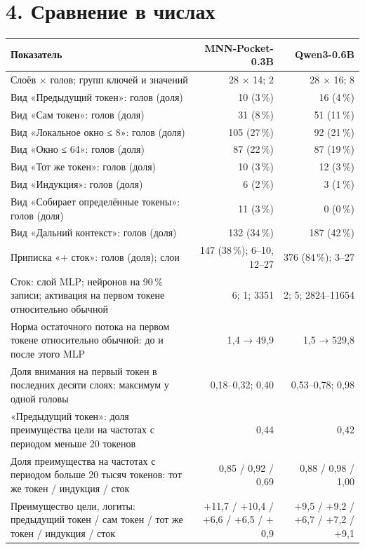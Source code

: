 \documentclass[10pt]{article}
\begin{document}
\noindent\begin{minipage}{\linewidth}
\section*{4. Сравнение в числах}
\begin{center}{\small\begin{tabular}{|p{11.2cm}|r|r|}\hline
\rowcolor{head}\textbf{Показатель} & \textbf{MNN-Pocket-0.3B} & \textbf{Qwen3-0.6B} \\ \hline
Слоёв $\times$ голов; групп ключей и значений & 28 $\times$ 14; 2 & 28 $\times$ 16; 8 \\ \hline
Вид «Предыдущий токен»: голов (доля) & 10 (3\,\%) & 16 (4\,\%) \\ \hline
Вид «Сам токен»: голов (доля) & 31 (8\,\%) & 51 (11\,\%) \\ \hline
Вид «Локальное окно ≤ 8»: голов (доля) & 105 (27\,\%) & 92 (21\,\%) \\ \hline
Вид «Окно ≤ 64»: голов (доля) & 87 (22\,\%) & 87 (19\,\%) \\ \hline
Вид «Тот же токен»: голов (доля) & 10 (3\,\%) & 12 (3\,\%) \\ \hline
Вид «Индукция»: голов (доля) & 6 (2\,\%) & 3 (1\,\%) \\ \hline
Вид «Собирает определённые токены»: голов (доля) & 11 (3\,\%) & 0 (0\,\%) \\ \hline
Вид «Дальний контекст»: голов (доля) & 132 (34\,\%) & 187 (42\,\%) \\ \hline
Приписка «+ сток»: голов (доля); слои & 147 (38\,\%); \mbox{6–10}, \mbox{12–27} & 376 (84\,\%); \mbox{3–27} \\ \hline
Сток: слой MLP; нейронов на 90\,\% записи; активация на первом токене относительно обычной & 6; 1; 3351 & 2; 5; 2824–11654 \\ \hline
Норма остаточного потока на первом токене относительно обычной: до и после этого MLP & 1,4 → 49,9 & 1,5 → 529,8 \\ \hline
Доля внимания на первый токен в последних десяти слоях; максимум у одной головы & 0,18–0,32; 0,40 & 0,53–0,78; 0,98 \\ \hline
«Предыдущий токен»: доля преимущества цели на частотах с периодом меньше 20 токенов & 0,44 & 0,42 \\ \hline
Доля преимущества на частотах с периодом больше 20 тысяч токенов: тот же токен / индукция / сток & 0,85 / 0,92 / 0,69 & 0,88 / 0,98 / 1,00 \\ \hline
Преимущество цели, логиты: предыдущий токен / сам токен / тот же токен / индукция / сток & $+$11,7 / $+$10,4 / $+$6,6 / $+$6,5 / $+$0,9 & $+$9,5 / $+$9,2 / $+$6,7 / $+$7,2 / $+$9,1 \\ \hline

\end{tabular}}
\end{center}
\end{minipage}
\end{document}
